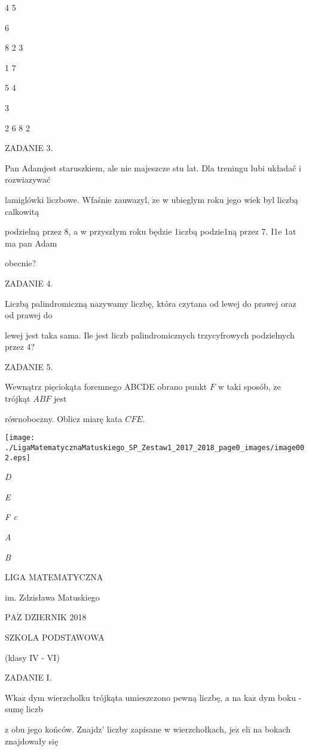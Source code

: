 \documentclass[a4paper,12pt]{article}
\begin{document}
4  5

6

8  2 3

1  7

5  4

3

2  6  8  2

ZADANIE 3.

Pan Adamjest staruszkiem, ale nie majeszcze stu lat. Dla treningu lubi układač i rozwiazywać

lamiglówki liczbowe. Wfaśnie zauwazyl, $\dot{\mathrm{z}}\mathrm{e}$ w ubieglym roku jego wiek byl liczbą calkowitą

podzielną przez 8, a w przyszłym roku będzie 1iczbą podzie1ną przez 7. I1e 1at ma pan Adam

obecnie?

ZADANIE 4.

Liczbą palindromiczną nazywamy liczbę, która czytana od lewej do prawej oraz od prawej do

lewej jest taka sama. Ile jest liczb palindromicznych trzycyfrowych podzielnych przez 4?

ZADANIE 5.

Wewnątrz pięciokąta foremnego ABCDE obrano punkt $F$ w taki sposób, $\dot{\mathrm{z}}\mathrm{e}$ trójkąt $ABF$ jest

równoboczny. Oblicz miarę kata $CFE.$
\begin{center}
\texttt{[image: ./LigaMatematycznaMatuskiego\_SP\_Zestaw1\_2017\_2018\_page0\_images/image002.eps]}
\end{center}
{\it D}

{\it E}

{\it F c}

{\it A}

{\it B}






LIGA MATEMATYCZNA

im. Zdzisława Matuskiego

$\mathrm{P}\mathrm{A}\dot{\mathrm{Z}}$ DZIERNIK 2018

SZKOLA PODSTAWOWA

(klasy IV - VI)

ZADANIE I.

$\mathrm{W}\mathrm{k}\mathrm{a}\dot{\mathrm{z}}$ dym wierzcholku trójkąta umieszczono pewną liczbę, a na $\mathrm{k}\mathrm{a}\dot{\mathrm{z}}$ dym boku - sumę liczb

z obu jego końców. Znajdz' liczby zapisane w wierzchołkach, $\mathrm{j}\mathrm{e}\dot{\mathrm{z}}$ eli na bokach znajdowały się
\end{document}
